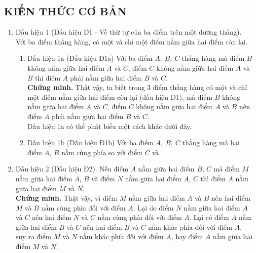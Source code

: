\subsection{KIẾN THỨC CƠ BẢN}
\begin{enumerate}
	\item Dấu hiệu 1 (Dấu hiệu Đ1 - Về thứ tự của ba điểm trên một đường thẳng).\\
	Với ba điểm thẳng hàng, có một và chỉ một điểm nằm giữa hai điểm còn lại.
	\begin{enumerate}
		\item Dấu hiệu 1a (Dấu hiệu Đ1a) Với ba điểm $ A,\ B,\ C $ thẳng hàng mà điểm $ B $ không nằm giữa hai điểm $ A $ và $ C $, điểm $ C $ không nằm giữa hai điểm $ A $ và $ B $ thì điểm $ A $ phải nằm giữa hai điểm $ B $ và $ C $.\\
		\textbf{Chứng minh.} Thật vậy, ta biết trong $ 3 $ điểm thẳng hàng có một và chỉ một điểm nằm giữa hai điểm còn lại (dấu hiệu Đ1), mà điểm $ B $ không nằm giữa hai điểm $ A $ và $ C $, điểm $ C $ không nằm giữa hai điểm $ A $ và $ B $ nên điểm $ A $ phải nằm giữa hai điểm $ B $ và $ C $.\\
		Dấu hiệu 1a có thể phát biểu một cách khác dưới đây.
		\item Dấu hiệu 1b (Dấu hiệu Đ1b) Với ba điểm $ A,\ B,\ C $ thẳng hàng mà hai điểm $ A $, $ B $ nằm cùng phía so với điểm $ C $ và 
	\end{enumerate}
	\item Dấu hiệu 2 (Dấu hiệu Đ2). Nếu điểm $ A $ nằm giữa hai điểm $ B $, $ C $ mà điểm $ M $ nằm giữa hai điểm $ A $, $ B $ và điểm $ N $ nằm giữa hai điểm $ A $, $ C $ thì điểm $ A $ nằm giữa hai điểm $ M $ và $ N $.\\
	\textbf{Chứng minh.} Thật vậy, vì điểm $ M $ nằm giữa hai điểm $ A $ và $ B $ nên hai điểm $ M $ và $ B $ nằm cùng phía đối với điểm $ A $. Lại do điểm $ N $ nằm giữa hai điểm $ A $ và $ C $ nên hai điểm $ N $ và $ C $ nằm cùng phía đối với điểm $ A $. Lại có điểm $ A $ nằm giữa hai điểm $ B $ và $ C $ nên hai điểm $ B $ và $ C $ nằm khác phía đối với điểm $ A $, suy ra điểm $ M $ và $ N $ nằm khác phía đối với điểm $ A $, hay điểm $ A $ nằm giữa hai điểm $ M $ và $ N $.
\end{enumerate}

